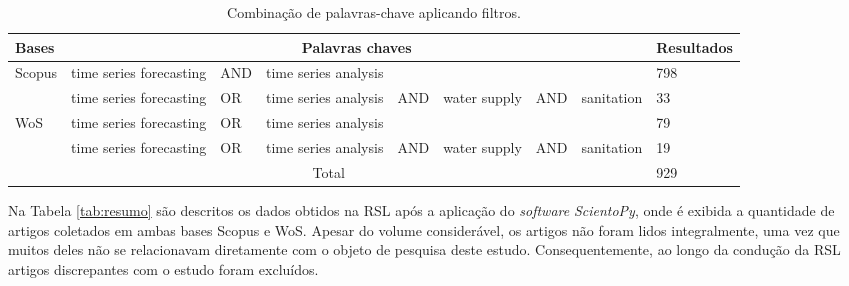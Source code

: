 \begin{table}[!htb]
	\centering
	\caption{Combinação de palavras-chave aplicando filtros.}\label{tb1}
	\begin{tabular}{@{}lp{2cm}lp{2cm}lp{1.5cm}lp{2cm}l@{}}
		\toprule
		Bases                  & \multicolumn{7}{c}{Palavras chaves}                              & Resultados \\ \midrule
		\multirow{2}{*}{Scopus} & time series forecasting & AND & time series analysis &     &              &     &            & 798        \\
		& time series forecasting & OR  & time series analysis & AND & water supply & AND & sanitation & 33         \\ \hline
		\multirow{2}{*}{WoS}    & time series forecasting & OR  & time series analysis &     &              &     &            & 79         \\
		& time series forecasting & OR  & time series analysis & AND & water supply & AND & sanitation & 19         \\ \hline
		\multicolumn{8}{c}{Total}                                                                                              & 929        \\ \bottomrule
	\end{tabular}	
\end{table}

Na Tabela \ref{tab:resumo} são descritos os dados obtidos na RSL após a aplicação do \textit{software} \textit{ScientoPy}, onde é exibida a quantidade de artigos coletados em ambas bases Scopus e WoS. Apesar do volume considerável, os artigos não foram lidos integralmente, uma vez que muitos deles não se relacionavam diretamente com o objeto de pesquisa deste estudo. Consequentemente, ao longo da condução da RSL artigos discrepantes com o estudo foram excluídos.

